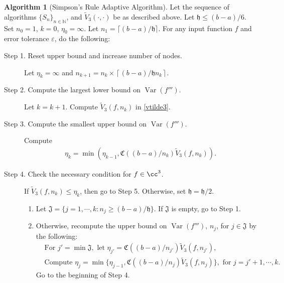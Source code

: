 \documentclass[draft]{iitthesis}
\DeclareMathOperator{\Var}{Var}
\theoremstyle{definition}
\newtheorem{algo}{Algorithm}
\theoremstyle{remark}
\begin{document}
\begin{algo} [Simpson's Rule Adaptive Algorithm] \label{multistageintegalgosimpson}
Let the sequence of algorithms $\{S_n\}_{n\in \mathbb{N}}$, %
and $\widetilde{V}_3(\cdot,\cdot)$ be as described above.
Let $\mathfrak{h}\le (b-a)/6$. Set $n_{0}=1$, $k=0$, $\eta_{0}=\infty$. Let $n_1=\lceil(b-a)/\mathfrak{h}\rceil$. For any input function $f$ and error tolerance $\varepsilon$, do the following: %
\begin{description}
\item[Step 1. Reset upper bound and increase number of nodes.] Let $\eta_{k}=\infty$ and $n_{k+1}=n_k\times\left\lceil(b-a)/\mathfrak{h}n_{k}\right\rceil$.

\item[Step 2. Compute the largest lower bound on {$\Var(f''')$}.] Let $k=k+1$. Compute  $\widetilde{V}_3(f,n_k)$ in \eqref{vtilde3}.%

\item[Step 3. Compute the smallest upper bound on {$\Var(f''')$}.] Compute
    \begin{align*}
        \eta_{k}=\min\left(\eta_{k-1},\mathfrak{C}((b-a)/n_{k})\widetilde{V}_3(f,n_k)\right).
    \end{align*}

\item[Step 4. Check the necessary condition for $f \in \cc^3$.] If $\widetilde{V}_3(f,n_k) \le \eta_{k}$, then go to Step 5.
  Otherwise, set $\mathfrak{h} = \mathfrak{h}/2$.
    \begin{enumerate}[label=\alph*)]
      \item Let $\mathfrak{J}=\{j=1, \cdots, k: n_{j}\ge (b-a)/\mathfrak{h}\}$. If $\mathfrak{J}$ is empty, go to Step 1.
      \item Otherwise, recompute the upper bound on $\Var(f''')$, $n_{j}$, for $j \in \mathfrak{J}$ by the following: 
      \begin{align*}
        &\text{For } j'=\min\mathfrak{J}, \text{ let } \eta_{j'}=\mathfrak{C}((b-a)/n_{j'})\widetilde{V}_3(f,n_{j'}), \\
        &\text{Compute } \eta_{j}=\min\{\eta_{j-1},\mathfrak{C}((b-a)/n_{j})\widetilde{V}_3(f,n_{j})\}, \text{ for } j=j'+1, \cdots, k.
      \end{align*}
      Go to the beginning of Step 4.
    \end{enumerate}



\end{description}
\end{algo}
\end{document}
